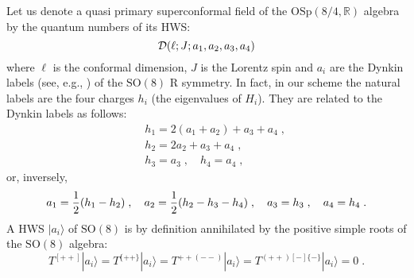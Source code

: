 \documentclass[a4paper,12pt]{article}
\begin{document}
Let us denote a quasi primary superconformal field of the 
$\mbox{OSp}(8/4,\mathbb{R})$ algebra by the quantum numbers of its 
HWS: 
\begin{equation}\label{555}
 {\cal D}(\ell; J; a_1,a_2,a_3,a_4)  
\end{equation}
where $\ell$ is the conformal dimension, $J$ is the Lorentz spin 
and $a_i$ are the Dynkin labels (see, e.g., \cite{FSS}) of the 
$\mbox{SO}(8)$ R symmetry. In fact, in our scheme the natural 
labels are the four charges $h_i$ (the eigenvalues of $H_i$). They 
are related to the Dynkin labels as follows: 
\begin{eqnarray}
  &&h_1= 2(a_1+a_2)+a_3+a_4\;, \nonumber\\
  &&h_2= 2a_2+a_3+a_4\;, \label{7.14}\\
  &&h_3=a_3\;,\quad h_4=a_4\;, \nonumber 
\end{eqnarray}
or, inversely,
\begin{equation}\label{7.14'}
  a_1= {1\over 2}(h_1-h_2)\;, \quad a_2= {1\over 2}(h_2-h_3-h_4)\;, \quad 
a_3=h_3\;, \quad a_4=h_4\;.
\end{equation}
A HWS $|a_i\rangle$ of $\mbox{SO}(8)$ is by definition annihilated 
by the positive simple roots of the $\mbox{SO}(8)$ algebra: 
\begin{equation}\label{7.15}
  T^{[++]}|a_i\rangle = T^{\{++\}}|a_i\rangle = 
T^{++(--)}|a_i\rangle = T^{(++)[-]\{-\}}|a_i\rangle = 0\;.
\end{equation}
\end{document}
